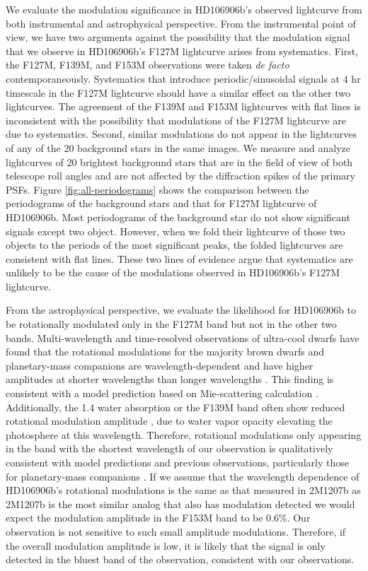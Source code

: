 \documentclass[twocolumn]{aastex62}
\begin{document}
We evaluate the modulation significance in HD106906b's observed lightcurve from both instrumental and astrophysical perspective. From the instrumental point of view, we have two arguments against the possibility that the modulation signal that we {observe} in HD106906b's F127M lightcurve {arises from} systematics. First, the F127M, F139M, and F153M observations were taken \emph{de facto} {contemporaneously}. Systematics that introduce periodic/sinusoidal signals at 4 hr timescale in the F127M lightcurve should have a similar effect on the other two lightcurves. The agreement of the  F139M and F153M lightcurves with flat lines is inconsistent with the possibility that modulations of the F127M lightcurve {are} due to systematics. Second, similar modulations do not appear in the lightcurves of any of the 20 background stars in the same images. We measure and analyze lightcurves of 20 brightest background stars that are in the field of view of both telescope roll angles and are not affected by the diffraction spikes of the primary PSFs.
Figure \ref{fig:all-periodograms} shows the comparison between the periodograms of the background stars and that for F127M lightcurve of HD106906b. Most periodograms of the background star do not show significant signals except two object. However, when we fold their lightcurve of those two objects to the periods of the most significant peaks, the folded lightcurves are consistent with flat lines. These two lines of evidence argue that systematics are unlikely to be the cause of the modulations observed in HD106906b's F127M lightcurve.

From the astrophysical perspective, we evaluate the likelihood for HD106906b to be rotationally modulated only in the F127M band but not in the other two bands. Multi-wavelength and time-resolved observations of ultra-cool dwarfs have found that the rotational modulations for the majority  brown dwarfs and planetary-mass companions are wavelength-dependent and have higher amplitudes at shorter wavelengths than longer wavelengths \citep[e.g.,][]{Zhou2019,Zhou2016,Yang2015,Apai2013,Schlawin2017}. This {finding} is consistent with a model prediction based on Mie-scattering calculation \citep{Hiranaka2016, Lew2016,Schlawin2017}. Additionally, the 1.4 \micron{} water absorption or the F139M band often show reduced rotational modulation amplitude \citep[e.g.,][]{Apai2013}, due to water vapor opacity elevating the photosphere at this wavelength.  Therefore, rotational modulations only appearing in the band with the shortest wavelength of our observation is qualitatively consistent with model predictions and previous observations, particularly those for planetary-mass companions \citep{Zhou2016,Zhou2019}. If we assume that the wavelength dependence of HD106906b's rotational modulations is the same as that measured in 2M1207b \citep{Zhou2016} as 2M1207b is the most similar analog that also has modulation detected we would expect the modulation amplitude in the F153M band to be 0.6\%. Our observation is not sensitive to such small amplitude modulations. Therefore, if the overall modulation amplitude is low, it is likely that the signal is only detected in the bluest band of the observation, consistent with our observations.
\end{document}
